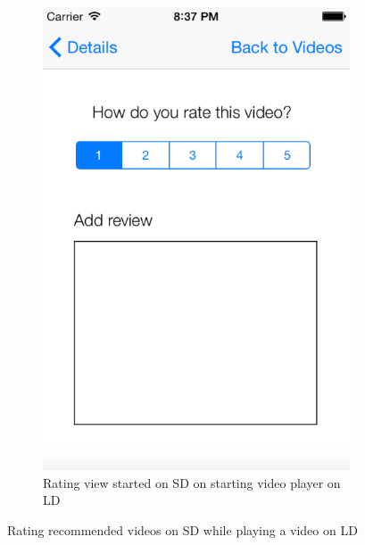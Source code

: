 \begin{figure}
\begin{subfigure}[b]{0.3\textwidth}
        \includegraphics[width=\textwidth]{figures/ratingSD}
        \caption{Rating view started on SD on starting video player on LD}
        \label{fig:figure46b}
    \end{subfigure}
   \caption{Rating recommended videos on SD while playing a video on LD}\label{fig:figure46}
\end{figure}       
